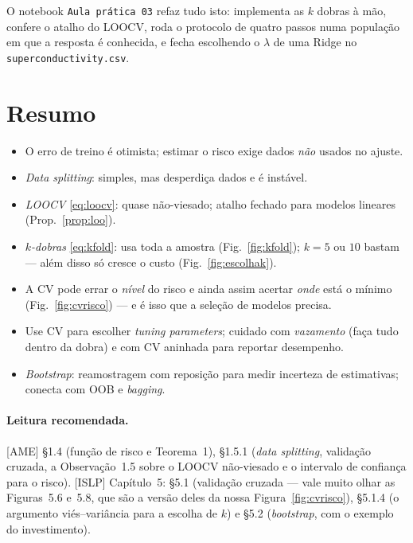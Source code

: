 \documentclass[11pt,a4paper]{article}
\begin{document}
O notebook \texttt{Aula prática 03} refaz tudo isto: implementa as $k$ dobras à mão,
confere o atalho do LOOCV, roda o protocolo de quatro passos numa população em que
a resposta é conhecida, e fecha escolhendo o $\lambda$ de uma Ridge no
\texttt{superconductivity.csv}.

\section*{Resumo}
\begin{itemize}[leftmargin=1.4cm]
  \item O erro de treino é otimista; estimar o risco exige dados \emph{não}
        usados no ajuste.
  \item \emph{Data splitting}: simples, mas desperdiça dados e é instável.
  \item \emph{LOOCV} \eqref{eq:loocv}: quase não-viesado; atalho fechado para
        modelos lineares (Prop.~\ref{prop:loo}).
  \item \emph{$k$-dobras} \eqref{eq:kfold}: usa toda a amostra
        (Fig.~\ref{fig:kfold}); $k=5$ ou $10$ bastam --- além disso só cresce o
        custo (Fig.~\ref{fig:escolhak}).
  \item A CV pode errar o \emph{nível} do risco e ainda assim acertar \emph{onde}
        está o mínimo (Fig.~\ref{fig:cvrisco}) --- e é isso que a seleção de
        modelos precisa.
  \item Use CV para escolher \emph{tuning parameters}; cuidado com \emph{vazamento}
        (faça tudo dentro da dobra) e com CV aninhada para reportar desempenho.
  \item \emph{Bootstrap}: reamostragem com reposição para medir incerteza de
        estimativas; conecta com OOB e \emph{bagging}.
\end{itemize}

\paragraph{Leitura recomendada.} [AME] §1.4 (função de risco e Teorema~1), §1.5.1
(\emph{data splitting}, validação cruzada, a Observação~1.5 sobre o LOOCV
não-viesado e o intervalo de confiança para o risco). [ISLP] Capítulo~5: §5.1
(validação cruzada --- vale muito olhar as Figuras~5.6 e~5.8, que são a versão deles
da nossa Figura~\ref{fig:cvrisco}), §5.1.4 (o argumento viés--variância para a
escolha de $k$) e §5.2 (\emph{bootstrap}, com o exemplo do investimento).
\end{document}
